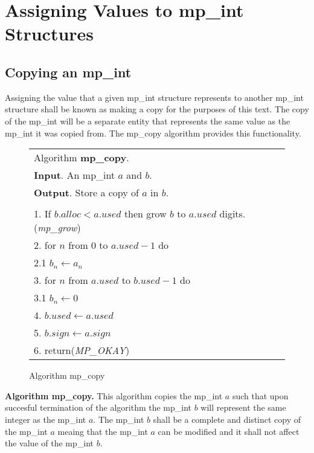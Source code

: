 \documentclass[b5paper]{book}
\begin{document}
\section{Assigning Values to mp\_int Structures}
\subsection{Copying an mp\_int}
Assigning the value that a given mp\_int structure represents to another mp\_int structure shall be known as making
a copy for the purposes of this text.  The copy of the mp\_int will be a separate entity that represents the same
value as the mp\_int it was copied from.  The mp\_copy algorithm provides this functionality. 

\newpage\begin{figure}[here]
\begin{center}
\begin{tabular}{l}
\hline Algorithm \textbf{mp\_copy}. \\
\textbf{Input}.  An mp\_int $a$ and $b$. \\
\textbf{Output}.  Store a copy of $a$ in $b$. \\
\hline \\
1.  If $b.alloc < a.used$ then grow $b$ to $a.used$ digits.  (\textit{mp\_grow}) \\
2.  for $n$ from 0 to $a.used - 1$ do \\
\hspace{3mm}2.1  $b_{n} \leftarrow a_{n}$ \\
3.  for $n$ from $a.used$ to $b.used - 1$ do \\
\hspace{3mm}3.1  $b_{n} \leftarrow 0$ \\
4.  $b.used \leftarrow a.used$ \\
5.  $b.sign \leftarrow a.sign$ \\
6.  return(\textit{MP\_OKAY}) \\
\hline
\end{tabular}
\end{center}
\caption{Algorithm mp\_copy}
\end{figure}

\textbf{Algorithm mp\_copy.}
This algorithm copies the mp\_int $a$ such that upon succesful termination of the algorithm the mp\_int $b$ will
represent the same integer as the mp\_int $a$.  The mp\_int $b$ shall be a complete and distinct copy of the 
mp\_int $a$ meaing that the mp\_int $a$ can be modified and it shall not affect the value of the mp\_int $b$.
\end{document}
